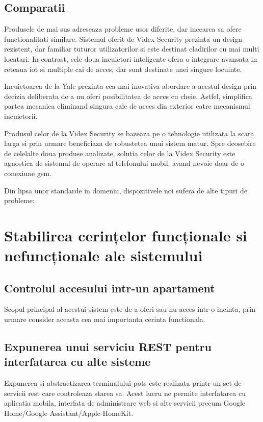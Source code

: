 \subsection {Comparatii}

Produsele de mai sus adreseaza probleme usor diferite, dar incearca sa ofere functionalitati similare. Sistemul oferit de Videx Security prezinta un design rezistent, dar familiar tuturor utilizatorilor si este destinat cladirilor cu mai multi locatari. In contrast, cele doua incuietori inteligente ofera o integrare avansata in reteaua \acrshort{iot} si multiple cai de acces, dar sunt destinate unei singure locuinte.

Incuietoarea de la Yale prezinta cea mai inovativa abordare a acestul design prin decizia deliberata de a nu oferi posibilitatea de acces cu cheie. Astfel, simplifica partea mecanica eliminand singura cale de acces din exterior catre mecanismul incuietorii.

Produsul celor de la Videx Security se bazeaza pe o tehnologie utilizata la scara larga si prin urmare beneficiaza de robustetea unui sistem matur. Spre deosebire de celelalte doua produse analizate, solutia celor de la Videx Security este agnostica de sistemul de operare al telefonului mobil, avand nevoie doar de o conexiune \acrshort{gsm}.

Din lipsa unor standarde in domeniu, dispozitivele noi sufera de alte tipuri de probleme:
\cite{Bitdefender2016IoT}

\section {Stabilirea cerințelor funcționale si nefuncționale ale sistemului}

\subsection{Controlul accesului intr-un apartament}

Scopul principal al acestui sistem este de a oferi sau nu acces intr-o incinta, prin urmare consider aceasta cea mai importanta cerinta functionala.

\subsection{Expunerea unui serviciu REST pentru interfatarea cu alte sisteme}

Expunerea si abstractizarea terminalului \acrshort{pots} este realizata printr-un set de servicii \acrfull{rest} care controleaza starea sa. Acest lucru ne permite interfatarea cu aplicatia mobila, interfata de administrare web si alte servicii precum Google Home/Google Assistant/Apple HomeKit.

